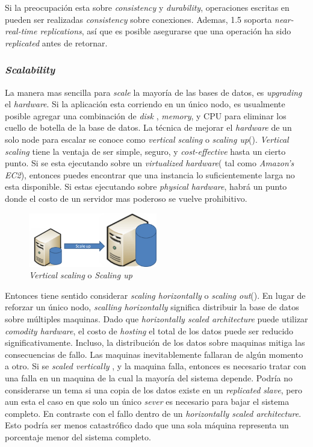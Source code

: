 Si la preocupación esta sobre \textit{consistency} y \textit{durability}, operaciones escritas en  pueden ser realizadas \textit{consistency} sobre conexiones. Ademas,  1.5 soporta \textit{near-real-time replications}, así que es posible asegurarse que una operación ha sido \textit{replicated} antes de retornar.

\subsubsection{\textit{Scalability}}
La manera mas sencilla para \textit{scale} la mayoría de las bases de datos, es \textit{upgrading} el \textit{hardware}. Si la aplicación esta corriendo en un único nodo, es usualmente posible agregar una combinación de \textit{disk} , \textit{memory}, y CPU para eliminar los cuello de botella de la base de datos. La técnica de mejorar el \textit{hardware} de un solo node para escalar se conoce como \textit{vertical scaling} o \textit{scaling up}(). \textit{Vertical scaling} tiene la ventaja de ser simple, seguro, y \textit{cost-effective} hasta un cierto punto. Si se esta ejecutando sobre un \textit{virtualized hardware}( tal como \textit{Amazon's EC2}), entonces puedes encontrar que una instancia lo suficientemente larga no esta disponible. Si estas ejecutando sobre \textit{physical hardware}, habrá un punto donde el costo de un servidor mas poderoso se vuelve prohibitivo.

\begin{figure}[h!]
	\centering
	\includegraphics[width=0.5\textwidth]{figuras/cap2/scale_up.png}
	\caption{\textit{Vertical scaling} o \textit{Scaling up} }
	\label{figure:figure_scale_up}
\end{figure}

Entonces tiene sentido  considerar \textit{scaling horizontally} o \textit{scaling out}(). En lugar de reforzar un único nodo, \textit{scalling horizontally} significa distribuir la base de datos sobre múltiples maquinas. Dado que \textit{horizontally scaled architecture} puede utilizar \textit{comodity hardware}, el costo de \textit{hosting} el total de los datos puede ser reducido significativamente. Incluso, la distribución  de los datos sobre maquinas mitiga las consecuencias de fallo. Las maquinas inevitablemente fallaran de algún momento a otro. Si se \textit{scaled vertically} , y la maquina falla, entonces es necesario tratar con una falla en un maquina de la cual la mayoría del sistema depende. Podría no considerarse un tema si una copia de los datos existe en un \textit{replicated slave}, pero aun esta el caso en que solo un único \textit{sever} es necesario para bajar el sistema completo. En contraste con el fallo dentro de un \textit{horizontally scaled architecture}. Esto podría ser menos catastrófico dado que una sola máquina representa un porcentaje menor del sistema completo.

